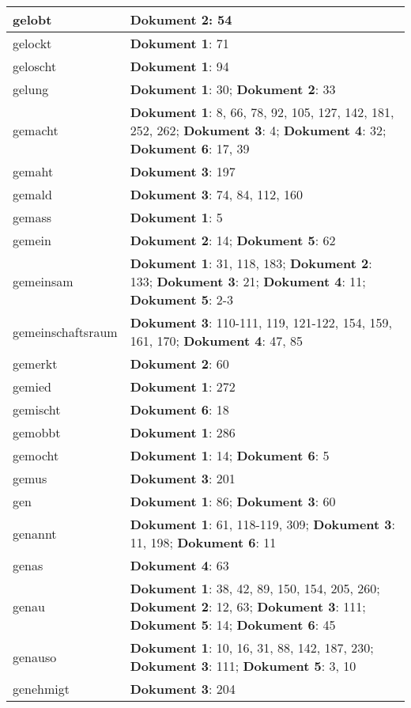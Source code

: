 \documentclass[a5paper]{article}
\begin{document}
\begin{longtable}[l]{|l|p{3in}|}
\hline
gelobt & \textbf{Dokument 2}: 54 \\
\hline
gelockt & \textbf{Dokument 1}: 71 \\
\hline
geloscht & \textbf{Dokument 1}: 94 \\
\hline
gelung & \textbf{Dokument 1}: 30; \textbf{Dokument 2}: 33 \\
\hline
gemacht & \textbf{Dokument 1}: 8, 66, 78, 92, 105, 127, 142, 181, 252, 262; \textbf{Dokument 3}: 4; \textbf{Dokument 4}: 32; \textbf{Dokument 6}: 17, 39 \\
\hline
gemaht & \textbf{Dokument 3}: 197 \\
\hline
gemald & \textbf{Dokument 3}: 74, 84, 112, 160 \\
\hline
gemass & \textbf{Dokument 1}: 5 \\
\hline
gemein & \textbf{Dokument 2}: 14; \textbf{Dokument 5}: 62 \\
\hline
gemeinsam & \textbf{Dokument 1}: 31, 118, 183; \textbf{Dokument 2}: 133; \textbf{Dokument 3}: 21; \textbf{Dokument 4}: 11; \textbf{Dokument 5}: 2-3 \\
\hline
gemeinschaftsraum & \textbf{Dokument 3}: 110-111, 119, 121-122, 154, 159, 161, 170; \textbf{Dokument 4}: 47, 85 \\
\hline
gemerkt & \textbf{Dokument 2}: 60 \\
\hline
gemied & \textbf{Dokument 1}: 272 \\
\hline
gemischt & \textbf{Dokument 6}: 18 \\
\hline
gemobbt & \textbf{Dokument 1}: 286 \\
\hline
gemocht & \textbf{Dokument 1}: 14; \textbf{Dokument 6}: 5 \\
\hline
gemus & \textbf{Dokument 3}: 201 \\
\hline
gen & \textbf{Dokument 1}: 86; \textbf{Dokument 3}: 60 \\
\hline
genannt & \textbf{Dokument 1}: 61, 118-119, 309; \textbf{Dokument 3}: 11, 198; \textbf{Dokument 6}: 11 \\
\hline
genas & \textbf{Dokument 4}: 63 \\
\hline
genau & \textbf{Dokument 1}: 38, 42, 89, 150, 154, 205, 260; \textbf{Dokument 2}: 12, 63; \textbf{Dokument 3}: 111; \textbf{Dokument 5}: 14; \textbf{Dokument 6}: 45 \\
\hline
genauso & \textbf{Dokument 1}: 10, 16, 31, 88, 142, 187, 230; \textbf{Dokument 3}: 111; \textbf{Dokument 5}: 3, 10 \\
\hline
genehmigt & \textbf{Dokument 3}: 204 \\

\end{longtable}
\end{document}
